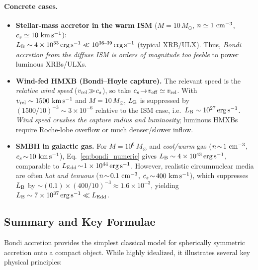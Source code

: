 \paragraph{Concrete cases.}
\begin{itemize}
\item \textbf{Stellar-mass accretor in the warm ISM} ($M=10\,M_\odot$, $n\simeq 1~{\rm cm^{-3}}$, $c_s\simeq 10~{\rm km\,s^{-1}}$):\\
$L_{\rm B}\sim 4\times 10^{33}\,{\rm erg\,s^{-1}} \ll 10^{36\!-\!39}\,{\rm erg\,s^{-1}}$ (typical XRB/ULX).
Thus, \emph{Bondi accretion from the diffuse ISM is orders of magnitude too feeble}
to power luminous XRBs/ULXs.

\item \textbf{Wind-fed HMXB (Bondi–Hoyle capture).} The relevant speed is the \emph{relative wind speed}
($v_{\rm rel}\!\gg\! c_s$), so take $c_s\!\to\! v_{\rm eff}\simeq v_{\rm rel}$. With $v_{\rm rel}\sim 1500~{\rm km\,s^{-1}}$ and $M=10\,M_\odot$,
$L_{\rm B}$ is suppressed by $(1500/10)^{-3}\!\sim\!3\times 10^{-6}$ relative to the ISM case, i.e.\ $L_{\rm B}\sim 10^{27}\,{\rm erg\,s^{-1}}$.
\emph{Wind speed crushes the capture radius and luminosity}; luminous HMXBs require Roche-lobe overflow or much denser/slower inflow.

\item \textbf{SMBH in galactic gas.}
For $M=10^{6}\,M_\odot$ and \emph{cool/warm} gas ($n\!\sim\!1~{\rm cm^{-3}}$, $c_s\!\sim\!10~{\rm km\,s^{-1}}$),
Eq.~\eqref{eq:bondi_numeric} gives $L_{\rm B}\sim 4\times 10^{43}\,{\rm erg\,s^{-1}}$, comparable to $L_{\rm Edd}\!\sim\!1\times 10^{44}\,{\rm erg\,s^{-1}}$.
However, realistic circumnuclear media are often \emph{hot and tenuous} ($n\!\sim\!0.1~{\rm cm^{-3}}$, $c_s\!\sim\!400~{\rm km\,s^{-1}}$),
which suppresses $L_{\rm B}$ by $\sim (0.1)\times (400/10)^{-3}\!\approx\!1.6\times 10^{-3}$,
yielding $L_{\rm B}\sim 7\times 10^{37}\,{\rm erg\,s^{-1}} \ll L_{\rm Edd}$.
\end{itemize}
\subsection*{Summary and Key Formulae}

Bondi accretion provides the simplest classical model for spherically symmetric accretion onto a compact object. While highly idealized, it illustrates several key physical principles:

